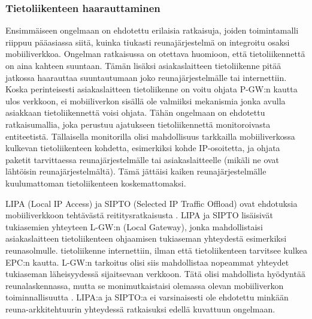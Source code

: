 \subsubsection*{Tietoliikenteen haarauttaminen}
Ensimmäiseen ongelmaan on ehdotettu erilaisia ratkaisuja, joiden toimintamalli riippuu pääasiassa siitä, kuinka tiukasti reunajärjestelmä on integroitu osaksi mobiiliverkkoa.
Ongelman ratkaisussa on otettava huomioon, että tietoliikennettä on aina kahteen suuntaan. Tämän lisäksi asiakaslaitteen tietoliikenne pitää jatkossa haarauttaa suuntautumaan joko reunajärjestelmälle tai internettiin. 
Koska perinteisesti asiakaslaitteen tietoliikenne on voitu ohjata P-GW:n kautta ulos verkkoon, ei mobiiliverkon sisällä ole valmiiksi mekanismia jonka avulla asiakkaan tietoliikennettä voisi ohjata.
Tähän ongelmaan on ehdotettu ratkaisumallia, joka perustuu ajatukseen tietoliikennettä monitoroivasta entiteetistä.
Tällaisella monitorilla olisi mahdollisuus tarkkailla mobiiliverkossa kulkevan tietoliikenteen kohdetta, esimerkiksi kohde IP-osoitetta, ja ohjata paketit tarvittaessa reunajärjestelmälle tai asiakaslaitteelle (mikäli ne ovat lähtöisin reunajärjestelmältä).
Tämä jättäisi kaiken reunajärjestelmälle kuulumattoman tietoliikenteen koskemattomaksi.

LIPA (Local IP Access) ja SIPTO (Selected IP Traffic Offload) ovat ehdotuksia mobiiliverkkoon tehtävästä reititysratkaisusta \cite{samdanis2012traffic,3gpplipa}.
LIPA ja SIPTO lisäisivät tukiasemien yhteyteen L-GW:n (Local Gateway), jonka mahdollistaisi asiakaslaitteen tietoliikenteen ohjaamisen tukiaseman yhteydestä esimerkiksi reunasolmulle. tietoliikenne internettiin, ilman että tietoliikenteen tarvitsee kulkea EPC:n kautta. 
L-GW:n tarkoitus olisi siis mahdollistaa nopeammat yhteydet tukiaseman läheisyydessä sijaitsevaan verkkoon. Tätä olisi mahdollista hyödyntää reunalaskennassa, mutta se monimutkaistaisi olemassa olevan mobiiliverkon toiminnallisuutta \cite{cho2014smore}.
LIPA:a ja SIPTO:a ei varsinaisesti ole ehdotettu minkään reuna-arkkitehtuurin yhteydessä ratkaisuksi edellä kuvattuun ongelmaan. 

